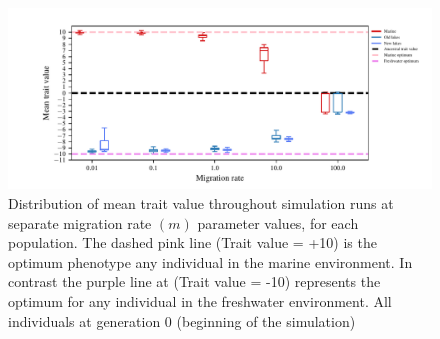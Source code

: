 \documentclass{article}
\begin{document}
\begin{figure}
	\begin{center}
  		\includegraphics{Final_Plots/Pheno_Dist.pdf}
  		\caption{Distribution of mean trait value throughout simulation runs at separate migration rate $(m)$ parameter values, for each population.
		The dashed pink line (Trait value = +10) is the optimum phenotype any individual in the marine environment.
		In contrast the purple line at (Trait value = -10) represents the optimum for any individual in the freshwater environment. 
		All individuals at generation 0 (beginning of the simulation) 
		}
  		\label{fig:MeanPhenotype}
	\end{center}
\end{figure}
\end{document}
